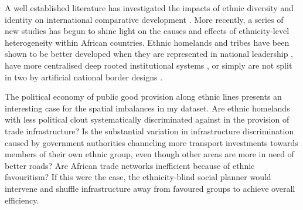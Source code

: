 \documentclass[11pt, oneside]{article}   	%
\begin{document}
A well established literature has investigated the impacts of ethnic diversity and identity on international comparative development \citep{Easterly_AfricaGrowthTragedy_1997,Alesina_EthnicDiversityEconomic_2005,gennaioli_modern_2007,Alesina_Ethnicinequality_2016}. More recently, a series of new studies has begun to shine light on the causes and effects of ethnicity-level heterogeneity within African countries. Ethnic homelands and tribes have been shown to be better developed when they are represented in national leadership \citep{Franck_DoesLeaderEthnicity_2012}, have more centralised deep rooted institutional systems \citep{Michalopoulos_PreColonialEthnicInstitutions_2013}, or simply are not split in two by artificial national border designs \citep{Michalopoulos_LongRunEffectsScramble_2016}.

The political economy of public good provision along ethnic lines presents an interesting case for the spatial imbalances in my dataset. Are ethnic homelands with less political clout systematically discriminated against in the provision of trade infrastructure? Is the substantial variation in infrastructure discrimination caused by government authorities channeling more transport investments towards members of their own ethnic group, even though other areas are more in need of better roads? Are African trade networks inefficient because of ethnic favouritism? If this were the case, the ethnicity-blind social planner would intervene and shuffle infrastructure away from favoured groups to achieve overall efficiency.
\end{document}

